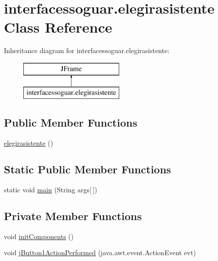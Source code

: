 \hypertarget{classinterfacessoguar_1_1elegirasistente}{}\section{interfacessoguar.\+elegirasistente Class Reference}
\label{classinterfacessoguar_1_1elegirasistente}
Inheritance diagram for interfacessoguar.\+elegirasistente\+:\begin{figure}[H]
\begin{center}
\leavevmode
\includegraphics[height=2.000000cm]{classinterfacessoguar_1_1elegirasistente}
\end{center}
\end{figure}
\subsection*{Public Member Functions}
\begin{DoxyCompactItemize}
\item 
\mbox{\hyperlink{classinterfacessoguar_1_1elegirasistente_ae52ebd382dfff12ce74deef5f47afdf7}{elegirasistente}} ()
\end{DoxyCompactItemize}
\subsection*{Static Public Member Functions}
\begin{DoxyCompactItemize}
\item 
static void \mbox{\hyperlink{classinterfacessoguar_1_1elegirasistente_a701a0924715cfb1c8bcf732b83a8bdc9}{main}} (String args\mbox{[}$\,$\mbox{]})
\end{DoxyCompactItemize}
\subsection*{Private Member Functions}
\begin{DoxyCompactItemize}
\item 
void \mbox{\hyperlink{classinterfacessoguar_1_1elegirasistente_a632fafbdcfeeb8573bd6a734a12966f9}{init\+Components}} ()
\item 
void \mbox{\hyperlink{classinterfacessoguar_1_1elegirasistente_a55c409487b826b045083e8ca0a748598}{j\+Button1\+Action\+Performed}} (java.\+awt.\+event.\+Action\+Event evt)
\end{DoxyCompactItemize}
